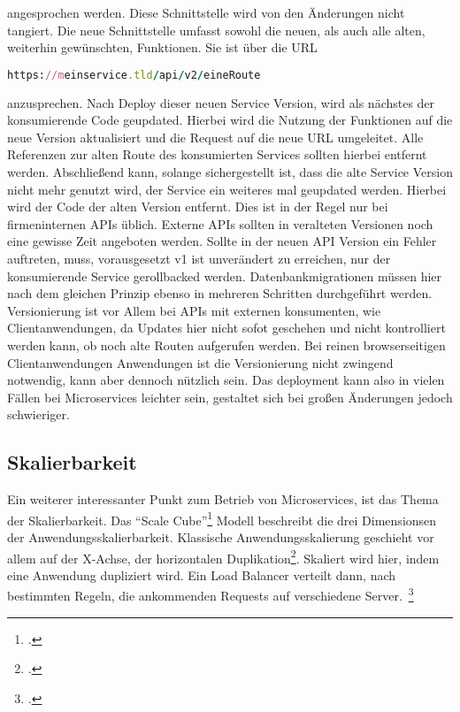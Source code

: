 \noindent angesprochen werden. Diese Schnittstelle wird von den Änderungen nicht tangiert. Die neue Schnittstelle umfasst sowohl die neuen, als auch alle alten, weiterhin gewünschten, Funktionen. Sie ist über die URL

\begin{lstlisting}[language=Ruby]
https://meinservice.tld/api/v2/eineRoute
\end{lstlisting}

\noindent anzusprechen. Nach Deploy dieser neuen Service Version, wird als nächstes der konsumierende Code geupdated. Hierbei wird die Nutzung der Funktionen auf die neue Version aktualisiert und die Request auf die neue URL umgeleitet. Alle Referenzen zur alten Route des konsumierten Services sollten hierbei entfernt werden. Abschließend kann, solange sichergestellt ist, dass die alte Service Version nicht mehr genutzt wird, der Service ein weiteres mal geupdated werden. Hierbei wird der Code der alten Version entfernt. Dies ist in der Regel nur bei firmeninternen APIs üblich. Externe APIs sollten in veralteten Versionen noch eine gewisse Zeit angeboten werden. Sollte in der neuen API Version ein Fehler auftreten, muss, vorausgesetzt v1 ist unverändert zu erreichen, nur der konsumierende Service gerollbacked werden.
Datenbankmigrationen müssen hier nach dem gleichen Prinzip ebenso in mehreren Schritten durchgeführt werden.
Versionierung ist vor Allem bei APIs mit externen konsumenten, wie Clientanwendungen, da Updates hier nicht sofot geschehen und nicht kontrolliert werden kann, ob noch alte Routen aufgerufen werden. Bei reinen browserseitigen Clientanwendungen Anwendungen ist die Versionierung nicht zwingend notwendig, kann aber dennoch nützlich sein.
Das deployment kann also in vielen Fällen bei Microservices leichter sein, gestaltet sich bei großen Änderungen jedoch schwieriger.

\subsection{Skalierbarkeit}
Ein weiterer interessanter Punkt zum Betrieb von Microservices, ist das Thema der Skalierbarkeit.
Das ``Scale Cube''\footcite[][]{abbott2009art} Modell beschreibt die drei Dimensionsen der Anwendungsskalierbarkeit. Klassische Anwendungsskalierung geschieht vor allem auf der X-Achse, der horizontalen Duplikation\footcite[][]{abbott2009art}. Skaliert wird hier, indem eine Anwendung dupliziert wird. Ein Load Balancer verteilt dann, nach bestimmten Regeln, die ankommenden Requests auf verschiedene Server.~\footcite[vgl.][]{loadbalancing} 

